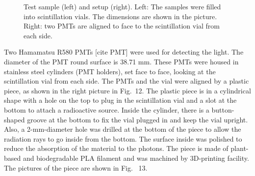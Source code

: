 \begin{figure}[htbp]
	\caption{Test sample (left) and setup (right). Left: The samples were filled into scintillation vials. The dimensions are shown in the picture. Right: two PMTs are aligned to face to the scintillation vial from each side.}
	\label{scintVial}
\end{figure}

Two Hamamatsu R580 PMTs [cite PMT] were used for detecting the light. The diameter of the PMT round surface is 38.71 mm. These PMTs were housed in stainless steel cylinders (PMT holders), set face to face, looking at the scintillation vial from each side. The PMTs and the vial were aligned by a plastic piece, as shown in the right picture in Fig.~12.  The plastic piece is in a cylindrical shape with a hole on the top to plug in the scintillation vial and a slot at the bottom to attach a radioactive source. Inside the cylinder, there is a button-shaped groove at the bottom to fix the vial plugged in and keep the vial upright. Also, a 2-mm-diameter hole was drilled at the bottom of the piece to allow the radiation rays to go inside from the bottom. The surface inside was polished to reduce the absorption of the material to the photons. The piece is made of plant-based and biodegradable PLA filament and was machined by 3D-printing facility. The pictures of the piece are shown in Fig.~ 13.


